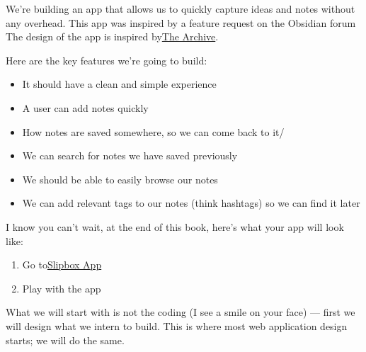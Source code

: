 \documentclass[11pt]{article}
\begin{document}
    We're building an app that allows us to quickly capture ideas and notes without any overhead.
    This app was inspired by a feature request on the Obsidian forum~\cite{FeatureWorkflowQuickly2023}
    The design of the app is inspired by\href{https://zettelkasten.de/the-archive/}{The Archive}.

    Here are the key features we're going to build:

    \begin{itemize}
        \item It should have a clean and simple experience
        \item A user can add notes quickly
        \item How notes are saved somewhere, so we can come back to it/
        \item We can search for notes we have saved previously
        \item We should be able to easily browse our notes
        \item We can add relevant tags to our notes (think hashtags) so we can find it later
    \end{itemize}

    I know you can't wait, at the end of this book, here's what your app will look like:

    \begin{enumerate}
        \item Go to\href{https://to.dto.sh/cfbp-app}{Slipbox App}
        \item Play with the app
    \end{enumerate}

    What we will start with is not the coding (I see a smile on your face) —
    first we will design what we intern to build.
    This is where most web application design starts; we will do the same.
\end{document}
